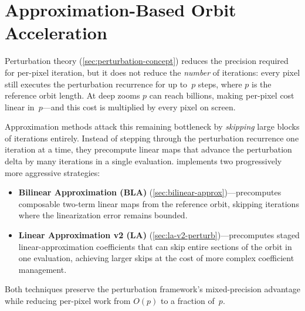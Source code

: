 
\section{Approximation-Based Orbit Acceleration}
\label{sec:approx-accel}

Perturbation theory (\cref{sec:perturbation-concept}) reduces the
precision required for per-pixel iteration, but it does not reduce the
\emph{number} of iterations: every pixel still executes the perturbation
recurrence for up to~$p$ steps, where $p$ is the reference orbit length.
At deep zooms $p$ can reach billions, making per-pixel cost linear
in~$p$---and this cost is multiplied by every pixel on screen.

Approximation methods attack this remaining bottleneck by \emph{skipping}
large blocks of iterations entirely.  Instead of stepping through the
perturbation recurrence one iteration at a time, they precompute linear
maps that advance the perturbation delta by many iterations in a single
evaluation.  \FractalShark{} implements two progressively more aggressive
strategies:
\begin{itemize}
\item \textbf{Bilinear Approximation (BLA)}
  (\cref{sec:bilinear-approx})---precomputes composable two-term linear
  maps from the reference orbit, skipping iterations where the
  linearization error remains bounded.
\item \textbf{Linear Approximation v2 (LA)}
  (\cref{sec:la-v2-perturb})---precomputes staged linear-approximation
  coefficients that can skip entire sections of the orbit in one
  evaluation, achieving larger skips at the cost of more complex
  coefficient management.
\end{itemize}
Both techniques preserve the perturbation framework's mixed-precision
advantage while reducing per-pixel work from $O(p)$ to a fraction of~$p$.

